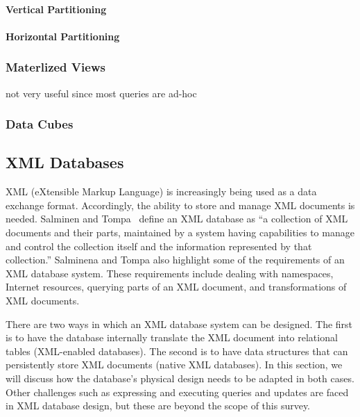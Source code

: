 \documentclass[12pt,a4paper]{article}
\begin{document}
\paragraph{Vertical Partitioning}

\paragraph{Horizontal Partitioning}

\subsubsection*{Materlized Views}
not very useful since most queries are ad-hoc \cite{653447}
\cite{355309}

\subsubsection*{Data Cubes}

\subsection{XML Databases}
\label{SEC-XML}

XML (eXtensible Markup Language) is increasingly being used as a data exchange format. Accordingly, the ability to store and manage XML documents is needed. Salminen and Tompa~\cite{salminen2001requirements} define an XML database as ``a collection of XML documents
and their parts, maintained by a system having capabilities to
manage and control the collection itself and the information
represented by that collection.'' Salminena and Tompa also highlight some of the requirements of an XML database system. These requirements include dealing with namespaces, Internet resources, querying parts of an XML document, and transformations of XML documents.

There are two ways in which an XML database system can be designed. The first is to have the database internally translate the XML document into relational tables (XML-enabled databases). The second is to have data structures that can persistently store XML documents (native XML databases). In this section, we will discuss how the database's physical design needs to be adapted in both cases. Other challenges such as expressing and executing queries and updates are faced in XML database design, but these are beyond the scope of this survey.

\end{document}
